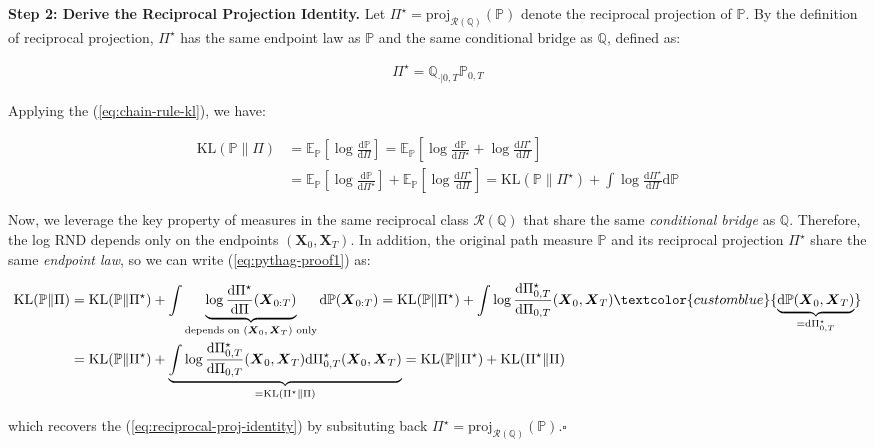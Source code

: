 \documentclass{article}
\newcommand{\bluetext}[1]{\textcolor{customblue}{#1}}
\begin{document}
\textbf{Step 2: Derive the Reciprocal Projection Identity. }
Let $\Pi^\star= \text{proj}_{\mathcal{R}(\mathbb{Q})}(\mathbb{P})$ denote the reciprocal projection of $\mathbb{P}$. By the definition of reciprocal projection, $\Pi^\star$ has the same endpoint law as $\mathbb{P}$ and the same conditional bridge as $\mathbb{Q}$, defined as:
\begin{small}
\begin{align}
    \Pi^\star=\mathbb{Q}_{\cdot|0,T}\mathbb{P}_{0,T}
\end{align}
\end{small}
Applying the (\ref{eq:chain-rule-kl}), we have:
\begin{small}
\begin{align}
    \text{KL}(\mathbb{P}\|\Pi)&=\mathbb{E}_{\mathbb{P}}\left[\log \frac{\mathrm{d}\mathbb{P}}{\mathrm{d}\Pi}\right]=\mathbb{E}_{\mathbb{P}}\left[\log \frac{\mathrm{d}\mathbb{P}}{\mathrm{d}\Pi^\star}+\log \frac{\mathrm{d}\Pi^\star}{\mathrm{d}\Pi}\right]\nonumber\\
    &=\mathbb{E}_{\mathbb{P}}\left[\log \frac{\mathrm{d}\mathbb{P}}{\mathrm{d}\Pi^\star}\right]+\mathbb{E}_{\mathbb{P}}\left[\log \frac{\mathrm{d}\Pi^\star}{\mathrm{d}\Pi}\right]=\text{KL}(\mathbb{P}\|\Pi^\star)+ \int \log \frac{\mathrm{d}\Pi^\star}{\mathrm{d}\Pi}\mathrm{d}\mathbb{P}\label{eq:pythag-proof1}
\end{align}
\end{small}
Now, we leverage the key property of measures in the same reciprocal class $\mathcal{R}(\mathbb{Q})$ that share the same \textit{conditional bridge} as $\mathbb{Q}$. Therefore, the log RND depends only on the endpoints $(\boldsymbol{X}_0, \boldsymbol{X}_T)$. In addition, the original path measure $\mathbb{P}$ and its reciprocal projection $\Pi^\star$ share the same \textit{endpoint law}, so we can write (\ref{eq:pythag-proof1}) as:
\begin{small}
\begin{align}
    \text{KL}(\mathbb{P}\|\Pi)&=\text{KL}(\mathbb{P}\|\Pi^\star)+ \int \underbrace{\log \frac{\mathrm{d}\Pi^\star}{\mathrm{d}\Pi}(\boldsymbol{X}_{0:T})}_{\text{depends on $(\boldsymbol{X}_0, \boldsymbol{X}_T)$ only}}\mathrm{d}\mathbb{P}(\boldsymbol{X}_{0:T})=\text{KL}(\mathbb{P}\|\Pi^\star)+ \int \log \frac{\mathrm{d}\Pi^\star_{0,T}}{\mathrm{d}\Pi_{0,T}}(\boldsymbol{X}_0, \boldsymbol{X}_T)\bluetext{\underbrace{\mathrm{d}\mathbb{P}(\boldsymbol{X}_0, \boldsymbol{X}_T)}_{=\mathrm{d}\Pi^\star_{0,T}}} \nonumber\\
    &=\text{KL}(\mathbb{P}\|\Pi^\star)+ \underbrace{\int \log \frac{\mathrm{d}\Pi^\star_{0,T}}{\mathrm{d}\Pi_{0,T}}(\boldsymbol{X}_0, \boldsymbol{X}_T)\mathrm{d}\Pi^\star_{0,T}(\boldsymbol{X}_0,\boldsymbol{X}_T)}_{=\text{KL}(\Pi^\star\|\Pi)}=\text{KL}(\mathbb{P}\|\Pi^\star)+\text{KL}(\Pi^\star\|\Pi)
\end{align}
\end{small}
which recovers the (\ref{eq:reciprocal-proj-identity}) by subsituting back $\Pi^\star =\text{proj}_{\mathcal{R}(\mathbb{Q})}(\mathbb{P})$.\hfill $\square$
\end{document}
